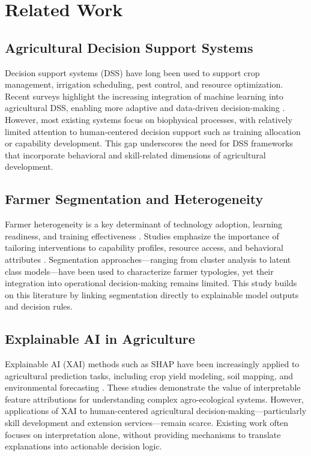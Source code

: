 \section{Related Work}

\subsection{Agricultural Decision Support Systems}

Decision support systems (DSS) have long been used to support crop management, irrigation scheduling, pest control, and resource optimization. Recent surveys highlight the increasing integration of machine learning into agricultural DSS, enabling more adaptive and data-driven decision-making \citep{ferreira2020mlagri}. However, most existing systems focus on biophysical processes, with relatively limited attention to human-centered decision support such as training allocation or capability development. This gap underscores the need for DSS frameworks that incorporate behavioral and skill-related dimensions of agricultural development.

\subsection{Farmer Segmentation and Heterogeneity}

Farmer heterogeneity is a key determinant of technology adoption, learning readiness, and training effectiveness \citep{feder1985adoption}. Studies emphasize the importance of tailoring interventions to capability profiles, resource access, and behavioral attributes \citep{davis2012impact}. Segmentation approaches—ranging from cluster analysis to latent class models—have been used to characterize farmer typologies, yet their integration into operational decision-making remains limited. This study builds on this literature by linking segmentation directly to explainable model outputs and decision rules.

\subsection{Explainable AI in Agriculture}

Explainable AI (XAI) methods such as SHAP have been increasingly applied to agricultural prediction tasks, including crop yield modeling, soil mapping, and environmental forecasting \citep{ryo2022shap}. These studies demonstrate the value of interpretable feature attributions for understanding complex agro-ecological systems. However, applications of XAI to human-centered agricultural decision-making—particularly skill development and extension services—remain scarce. Existing work often focuses on interpretation alone, without providing mechanisms to translate explanations into actionable decision logic.

